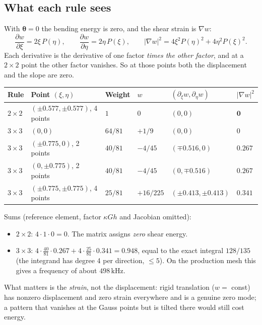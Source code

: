 \documentclass[11pt]{article}
\begin{document}
\subsection{What each rule sees}
With $\boldsymbol{\theta} = 0$ the bending energy is zero, and the shear strain is
$\nabla w$:
\begin{equation}
  \frac{\partial w}{\partial \xi} = 2\xi\, P(\eta), \qquad
  \frac{\partial w}{\partial \eta} = 2\eta\, P(\xi), \qquad
  |\nabla w|^2 = 4\xi^2 P(\eta)^2 + 4\eta^2 P(\xi)^2 .
\end{equation}
Each derivative is the derivative of one factor \emph{times the other factor}, and
at a $2\times 2$ point the other factor vanishes. So at those points both the
displacement and the slope are zero.
\begin{center}
\begin{tabular}{|l|l|l|l|l|l|}
\hline
Rule & Point $(\xi, \eta)$ & Weight & $w$ & $(\partial_\xi w, \partial_\eta w)$ & $|\nabla w|^2$ \\
\hline
$2\times 2$ & $(\pm 0.577, \pm 0.577)$, 4 points & $1$ & $0$ & $(0, 0)$ & $\mathbf{0}$ \\
\hline
$3\times 3$ & $(0, 0)$ & $64/81$ & $+1/9$ & $(0, 0)$ & $0$ \\
$3\times 3$ & $(\pm 0.775, 0)$, 2 points & $40/81$ & $-4/45$ & $(\mp 0.516, 0)$ & $\mathbf{0.267}$ \\
$3\times 3$ & $(0, \pm 0.775)$, 2 points & $40/81$ & $-4/45$ & $(0, \mp 0.516)$ & $\mathbf{0.267}$ \\
$3\times 3$ & $(\pm 0.775, \pm 0.775)$, 4 points & $25/81$ & $+16/225$ & $(\pm 0.413, \pm 0.413)$ & $\mathbf{0.341}$ \\
\hline
\end{tabular}
\end{center}
Sums (reference element, factor $\kappa G h$ and Jacobian omitted):
\begin{itemize}
  \item $2\times 2$: $4 \cdot 1 \cdot 0 = 0$. The matrix assigns \emph{zero} shear energy.
  \item $3\times 3$: $4 \cdot \tfrac{40}{81} \cdot 0.267 + 4 \cdot \tfrac{25}{81} \cdot 0.341
        = 0.948$, equal to the exact integral $128/135$ (the integrand has degree 4 per
        direction, $\le 5$). On the production mesh this gives a frequency of
        about $498\,\mathrm{kHz}$.
\end{itemize}
What matters is the \emph{strain}, not the displacement: rigid translation
($w = $ const) has nonzero displacement and zero strain everywhere and is a genuine
zero mode; a pattern that vanishes at the Gauss points but is tilted there would still
cost energy.
\end{document}
